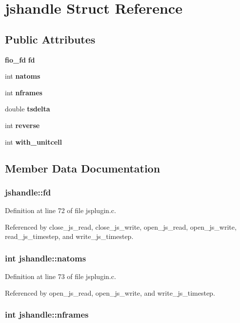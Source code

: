 \section{jshandle  Struct Reference}
\label{structjshandle}
\subsection*{Public Attributes}
\begin{CompactItemize}
\item 
{\bf fio\_\-fd} {\bf fd}
\item 
int {\bf natoms}
\item 
int {\bf nframes}
\item 
double {\bf tsdelta}
\item 
int {\bf reverse}
\item 
int {\bf with\_\-unitcell}
\end{CompactItemize}


\subsection{Member Data Documentation}
\subsubsection{ jshandle::fd}\label{structjshandle_m0}




Definition at line 72 of file jsplugin.c.

Referenced by close\_\-js\_\-read, close\_\-js\_\-write, open\_\-js\_\-read, open\_\-js\_\-write, read\_\-js\_\-timestep, and write\_\-js\_\-timestep.
\subsubsection{\setlength{\rightskip}{0pt plus 5cm}int jshandle::natoms}\label{structjshandle_m1}




Definition at line 73 of file jsplugin.c.

Referenced by open\_\-js\_\-read, open\_\-js\_\-write, and write\_\-js\_\-timestep.
\subsubsection{\setlength{\rightskip}{0pt plus 5cm}int jshandle::nframes}\label{structjshandle_m2}




